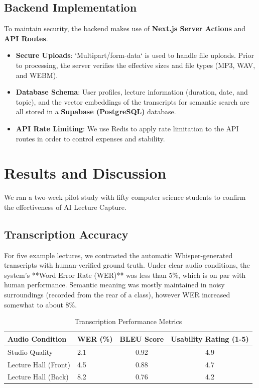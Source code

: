 \documentclass[runningheads]{llncs}
\begin{document}
\subsection{Backend Implementation}
To maintain security, the backend makes use of \textbf{Next.js Server Actions} and \textbf{API Routes}.
\begin{itemize}
    \item \textbf{Secure Uploads}: `Multipart/form-data` is used to handle file uploads. Prior to processing, the server verifies the effective sizes and file types (MP3, WAV, and WEBM).
    \item \textbf{Database Schema}: User profiles, lecture information (duration, date, and topic), and the vector embeddings of the transcripts for semantic search are all stored in a \textbf{Supabase (PostgreSQL)} database.
    \item \textbf{API Rate Limiting}: We use Redis to apply rate limitation to the API routes in order to control expenses and stability.
\end{itemize}

\section{Results and Discussion}
We ran a two-week pilot study with fifty computer science students to confirm the effectiveness of AI Lecture Capture.

\subsection{Transcription Accuracy}
For five example lectures, we contrasted the automatic Whisper-generated transcripts with human-verified ground truth. Under clear audio conditions, the system's **Word Error Rate (WER)** was less than 5\%, which is on par with human performance. Semantic meaning was mostly maintained in noisy surroundings (recorded from the rear of a class), however WER increased somewhat to about 8\%.

\begin{table}
\caption{Transcription Performance Metrics}\label{tab:performance_metrics}
\centering
\begin{tabular}{llcc}
\hline
\textbf{Audio Condition} & \textbf{WER (\%)} & \textbf{ BLEU Score} & \textbf{Usability Rating (1-5)} \\
\hline
Studio Quality & 2.1 & 0.92 & 4.9 \\
Lecture Hall (Front) & 4.5 & 0.88 & 4.7 \\
Lecture Hall (Back) & 8.2 & 0.76 & 4.2 \\
\hline
\end{tabular}
\end{table}
\end{document}
